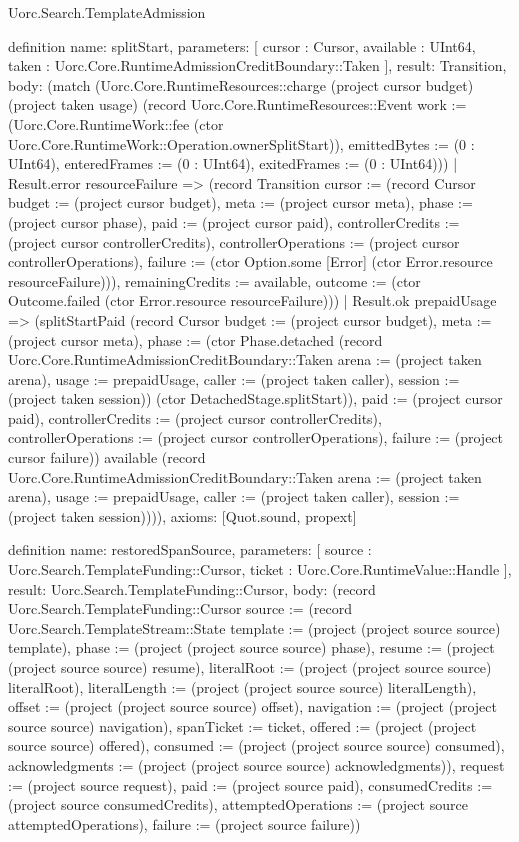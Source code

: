 \begin{lexlean}{Uorc.Search.TemplateAdmission}
\begin{semanticmodule}
definition{
  name: splitStart,
  parameters: [
    cursor : Cursor,
    available : UInt64,
    taken : Uorc.Core.RuntimeAdmissionCreditBoundary::Taken
  ],
  result: Transition,
  body: (match (Uorc.Core.RuntimeResources::charge (project cursor budget) (project taken usage) (record Uorc.Core.RuntimeResources::Event {work := (Uorc.Core.RuntimeWork::fee (ctor Uorc.Core.RuntimeWork::Operation.ownerSplitStart)), emittedBytes := (0 : UInt64), enteredFrames := (0 : UInt64), exitedFrames := (0 : UInt64)}))
    | Result.error resourceFailure => (record Transition {cursor := (record Cursor {budget := (project cursor budget), meta := (project cursor meta), phase := (project cursor phase), paid := (project cursor paid), controllerCredits := (project cursor controllerCredits), controllerOperations := (project cursor controllerOperations), failure := (ctor Option.some [Error] (ctor Error.resource resourceFailure))}), remainingCredits := available, outcome := (ctor Outcome.failed (ctor Error.resource resourceFailure))})
    | Result.ok prepaidUsage => (splitStartPaid (record Cursor {budget := (project cursor budget), meta := (project cursor meta), phase := (ctor Phase.detached (record Uorc.Core.RuntimeAdmissionCreditBoundary::Taken {arena := (project taken arena), usage := prepaidUsage, caller := (project taken caller), session := (project taken session)}) (ctor DetachedStage.splitStart)), paid := (project cursor paid), controllerCredits := (project cursor controllerCredits), controllerOperations := (project cursor controllerOperations), failure := (project cursor failure)}) available (record Uorc.Core.RuntimeAdmissionCreditBoundary::Taken {arena := (project taken arena), usage := prepaidUsage, caller := (project taken caller), session := (project taken session)}))),
  axioms: [Quot.sound, propext]
}

definition{
  name: restoredSpanSource,
  parameters: [
    source : Uorc.Search.TemplateFunding::Cursor,
    ticket : Uorc.Core.RuntimeValue::Handle
  ],
  result: Uorc.Search.TemplateFunding::Cursor,
  body: (record Uorc.Search.TemplateFunding::Cursor {source := (record Uorc.Search.TemplateStream::State {template := (project (project source source) template), phase := (project (project source source) phase), resume := (project (project source source) resume), literalRoot := (project (project source source) literalRoot), literalLength := (project (project source source) literalLength), offset := (project (project source source) offset), navigation := (project (project source source) navigation), spanTicket := ticket, offered := (project (project source source) offered), consumed := (project (project source source) consumed), acknowledgments := (project (project source source) acknowledgments)}), request := (project source request), paid := (project source paid), consumedCredits := (project source consumedCredits), attemptedOperations := (project source attemptedOperations), failure := (project source failure)})
}


\end{semanticmodule}
\end{lexlean}
